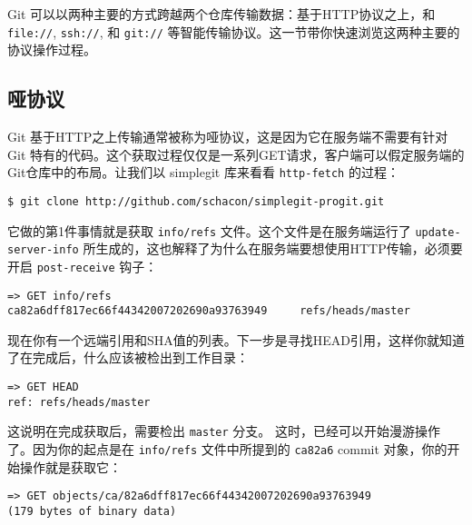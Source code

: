 \documentclass[a4paper]{book}
\begin{document}
Git 可以以两种主要的方式跨越两个仓库传输数据：基于HTTP协议之上，和 \texttt{file://}, \texttt{ssh://}, 和 \texttt{git://} 等智能传输协议。这一节带你快速浏览这两种主要的协议操作过程。

\subsection{哑协议}

Git 基于HTTP之上传输通常被称为哑协议，这是因为它在服务端不需要有针对 Git 特有的代码。这个获取过程仅仅是一系列GET请求，客户端可以假定服务端的Git仓库中的布局。让我们以 simplegit 库来看看 \texttt{http-fetch} 的过程：

\begin{shaded}\begin{verbatim}
$ git clone http://github.com/schacon/simplegit-progit.git
\end{verbatim}\end{shaded}

它做的第1件事情就是获取 \texttt{info/refs} 文件。这个文件是在服务端运行了 \texttt{update-server-info} 所生成的，这也解释了为什么在服务端要想使用HTTP传输，必须要开启 \texttt{post-receive} 钩子：

\begin{shaded}\begin{verbatim}
=> GET info/refs
ca82a6dff817ec66f44342007202690a93763949     refs/heads/master
\end{verbatim}\end{shaded}

现在你有一个远端引用和SHA值的列表。下一步是寻找HEAD引用，这样你就知道了在完成后，什么应该被检出到工作目录：

\begin{shaded}\begin{verbatim}
=> GET HEAD
ref: refs/heads/master
\end{verbatim}\end{shaded}

这说明在完成获取后，需要检出 \texttt{master} 分支。 这时，已经可以开始漫游操作了。因为你的起点是在 \texttt{info/refs} 文件中所提到的 \texttt{ca82a6} commit 对象，你的开始操作就是获取它：

\begin{shaded}\begin{verbatim}
=> GET objects/ca/82a6dff817ec66f44342007202690a93763949
(179 bytes of binary data)
\end{verbatim}\end{shaded}
\end{document}
